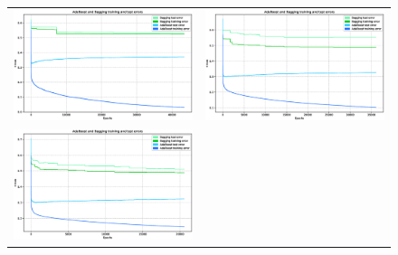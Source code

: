 \begin{figure}[htpb]
	\centering
		\begin{tabular}{c c}
			\includegraphics[scale=0.2]{figs/report_k2.eps} & \includegraphics[scale=0.2]{figs/report_k5.eps} \\
			\includegraphics[scale=0.2]{figs/report_k20.eps} &

\end{tabular}
\end{figure}
